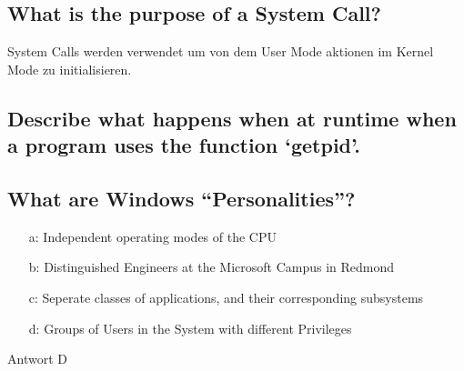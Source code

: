 %
%
%

\subsection{What is the purpose of a System Call?}
System Calls werden verwendet um von dem User Mode aktionen im Kernel Mode zu initialisieren.

\subsection{Describe what happens when at runtime when a program uses the function `getpid'.}
\missing

\subsection{What are Windows ``Personalities''?}
\begin{enumerate}
	\item[a:] Independent operating modes of the CPU
	\item[b:] Distinguished Engineers at the Microsoft Campus in Redmond
	\item[c:] Seperate classes of applications, and their corresponding subsystems
	\item[d:] Groups of Users in the System with different Privileges
\end{enumerate}
\unsure
Antwort D

